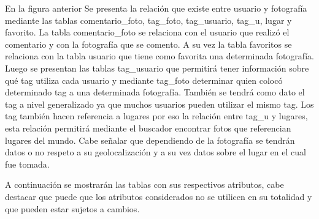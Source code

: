 \documentclass{memoria}
\begin{document}

En la figura anterior Se presenta la relación que existe entre usuario y fotografía mediante las tablas comentario\_foto, tag\_foto, tag\_usuario, tag\_u, lugar y favorito. La tabla comentario\_foto se relaciona con el usuario que realizó el comentario y con la fotografía que se comento. A su vez la tabla favoritos se relaciona con la tabla usuario que tiene como favorita una determinada fotografía. Luego se presentan las tablas tag\_usuario que permitirá tener información sobre qué tag utiliza cada usuario y mediante tag\_foto determinar quien colocó determinado tag a una determinada fotografía. También se tendrá como dato el tag a nivel generalizado ya que muchos usuarios pueden utilizar el mismo tag. Los tag también hacen referencia a lugares por eso la relación entre tag\_u y lugares, esta relación permitirá mediante el buscador encontrar fotos que referencian lugares del mundo. Cabe señalar que dependiendo de la fotografía se tendrán datos o no respeto a su geolocalización y a su vez datos sobre el lugar en el cual fue tomada.



A continuación se mostrarán las tablas con sus respectivos atributos, cabe destacar que puede que los atributos considerados no se utilicen en su totalidad y que pueden estar sujetos a cambios.

\end{document}
